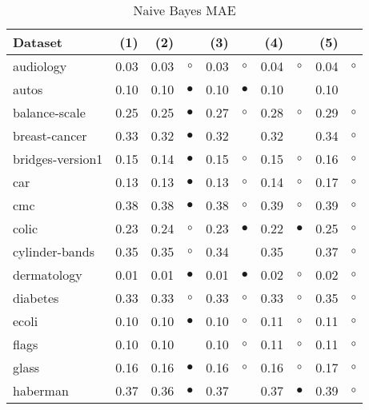 \begin{table}[H]
\caption{\label{nbmae}Naive Bayes MAE}
\footnotesize
{\centering \begin{tabular}{lrr@{\hspace{0.1cm}}cr@{\hspace{0.1cm}}cr@{\hspace{0.1cm}}cr@{\hspace{0.1cm}}c}
\\
\hline
Dataset & (1)& (2) & & (3) & & (4) & & (5) & \\
\hline
audiology & 0.03 & 0.03 &    $\circ$ & 0.03 &    $\circ$ & 0.04 &   $\circ$ & 0.04 &   $\circ$\\
autos & 0.10 & 0.10 &  $\bullet$ & 0.10 &  $\bullet$ & 0.10 &           & 0.10 &          \\
balance-scale & 0.25 & 0.25 &  $\bullet$ & 0.27 &    $\circ$ & 0.28 &   $\circ$ & 0.29 &   $\circ$\\
breast-cancer & 0.33 & 0.32 &  $\bullet$ & 0.32 &            & 0.32 &           & 0.34 &   $\circ$\\
bridges-version1 & 0.15 & 0.14 &  $\bullet$ & 0.15 &    $\circ$ & 0.15 &   $\circ$ & 0.16 &   $\circ$\\
car & 0.13 & 0.13 &  $\bullet$ & 0.13 &    $\circ$ & 0.14 &   $\circ$ & 0.17 &   $\circ$\\
cmc & 0.38 & 0.38 &  $\bullet$ & 0.38 &    $\circ$ & 0.39 &   $\circ$ & 0.39 &   $\circ$\\
colic & 0.23 & 0.24 &    $\circ$ & 0.23 &  $\bullet$ & 0.22 & $\bullet$ & 0.25 &   $\circ$\\
cylinder-bands & 0.35 & 0.35 &    $\circ$ & 0.34 &            & 0.35 &           & 0.37 &   $\circ$\\
dermatology & 0.01 & 0.01 &  $\bullet$ & 0.01 &  $\bullet$ & 0.02 &   $\circ$ & 0.02 &   $\circ$\\
diabetes & 0.33 & 0.33 &    $\circ$ & 0.33 &    $\circ$ & 0.33 &   $\circ$ & 0.35 &   $\circ$\\
ecoli & 0.10 & 0.10 &  $\bullet$ & 0.10 &    $\circ$ & 0.11 &   $\circ$ & 0.11 &   $\circ$\\
flags & 0.10 & 0.10 &            & 0.10 &    $\circ$ & 0.11 &   $\circ$ & 0.11 &   $\circ$\\
glass & 0.16 & 0.16 &  $\bullet$ & 0.16 &    $\circ$ & 0.16 &   $\circ$ & 0.17 &   $\circ$\\
haberman & 0.37 & 0.36 &  $\bullet$ & 0.37 &            & 0.37 & $\bullet$ & 0.39 &   $\circ$\\

\end{tabular}}
\end{table}
